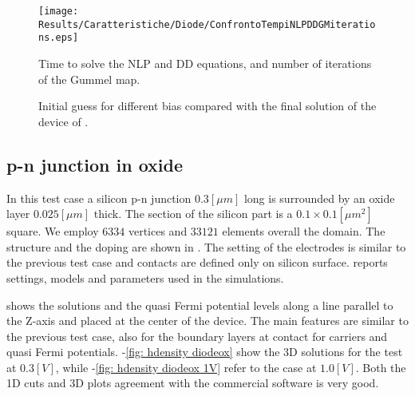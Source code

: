  
 \begin{figure}[!t]
\centering
\texttt{[image: Results/Caratteristiche/Diode/ConfrontoTempiNLPDDGMiterations.eps]}
\caption{Time to solve the NLP and DD equations, and number of  iterations of the Gummel map.}
\label{fig: tempi computazionali 2}
\end{figure}

\begin{figure}[!b]
\centering
{}
\caption{Initial guess for different bias compared with the final solution of the device of .}
\label{fig: different biast initial step}
\end{figure}
 



\clearpage


\subsection{p-n junction in oxide}
\label{sec: PNOX}

In this test case a silicon p-n junction $0.3[\mu m]$ long is surrounded by an oxide layer $0.025[\mu m]$ thick. The section of the silicon part is a $0.1 \times 0.1 [\mu m^2]$ square.  We employ $6334$ vertices and $33121$ elements overall the domain. The structure and the doping are shown in . The setting of the electrodes is similar to the previous test case and contacts are defined only on silicon surface. 
 reports settings, models and parameters used in the simulations.

 shows the solutions and the quasi Fermi potential levels along a line parallel to the Z-axis and placed at the center of the device. The main features are similar to the previous test case, also for the boundary layers at contact for carriers and quasi Fermi potentials.
-\ref{fig: hdensity diodeox} show the 3D solutions for the test at $0.3[V]$, while -\ref{fig: hdensity diodeox 1V} refer to the case at $1.0[V]$. Both the 1D cuts and 3D plots agreement with the commercial software is very good. 

\vspace{0.5cm}

